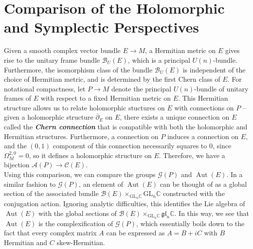 \documentclass[psamsfonts, 12pt]{amsart}
\theoremstyle{definition}
\theoremstyle{remark}
\newcommand{\ib}[1]{\textbf{\textit{#1}}}
\newcommand{\C}{\mathbb{C}}
\newcommand{\dbar}{\overline{\partial}}
\newcommand{\GL}{\mathrm{GL}}
\DeclareMathOperator{\Aut}{Aut}
\begin{document}
\section{Comparison of the Holomorphic and Symplectic Perspectives}
%
Given a smooth complex vector bundle $E \to M$, a Hermitian metric on $E$ gives rise
to the unitary frame bundle $\mathcal{B}_U(E)$, which is a principal $U(n)$-bundle.
Furthermore, the isomorphism class of the bundle $\mathcal{B}_U(E)$ is
independent of the choice of Hermitian metric, and is determined by the first
Chern class of $E$. For notational compactness, let $P \to M$ denote the
principal $U(n)$-bundle of unitary frames of $E$ with respect to a fixed
Hermitian metric on $E$. This Hermitian structure allows us to relate holomorphic
stuctures on $E$ with connections on $P$ -- given a holomorphic structure
$\dbar_E$ on $E$, there exists a unique connection on $E$ called the
\ib{Chern connection} that is compatible with both the holomorphic and Hermitian
structures. Furthermore, a connection on $P$ induces a connection on $E$,
and the $(0,1)$ component of this connection necessarily squares to $0$, since
$\Omega^{2,0}_M = 0$, so it defines a holomorphic structure on $E$. Therefore, we
have a bijection $\mathscr{A}(P) \to \mathscr{C}(E)$. \\

Using this comparison, we can compare the groups $\mathscr{G}(P)$ and $\Aut(E)$.
In a similar fashion to $\mathscr{G}(P)$, an element of $\Aut(E)$ can be
thought of as a global section of the associated bundle
$\mathcal{B}(E) \times_{\GL_n\C} \GL_n\C$ constructed with the conjugation action.
Ignoring analytic difficulties, this identifies the Lie algebra of $\Aut(E)$ with
the global sections of $\mathcal{B}(E) \times_{\GL_n\C} \mathfrak{gl}_n\C$. In this
way, we see that $\Aut(E)$ is the complexification of $\mathscr{G}(P)$, which
essentially boils down to the fact that every complex matrix $A$ can be expressed
as $A = B + iC$ with $B$ Hermitian and $C$ skew-Hermitian. \\
\end{document}
